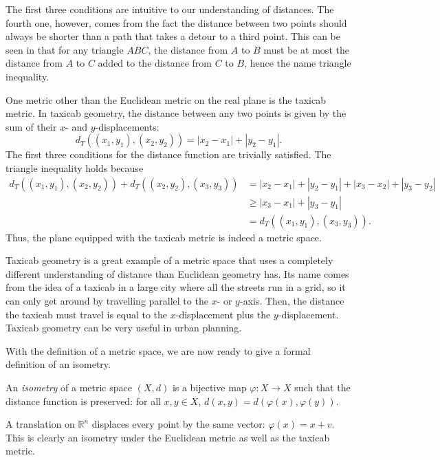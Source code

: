 \documentclass{mystyle}
\begin{document}
The first three conditions are intuitive to our understanding of distances. The fourth one, however, comes from the fact the distance between two points should always be shorter than a path that takes a detour to a third point. This can be seen in that for any triangle $ABC$, the distance from $A$ to $B$ must be at most the distance from $A$ to $C$ added to the distance from $C$ to $B$, hence the name triangle inequality.

\begin{example}
    One metric other than the Euclidean metric on the real plane is the taxicab metric. In taxicab geometry, the distance between any two points is given by the sum of their $x$- and $y$-displacements: 
    \[
    d_T((x_1,y_1), (x_2, y_2)) = |x_2-x_1| + |y_2-y_1|.
    \]
    The first three conditions for the distance function are trivially satisfied. The triangle inequality holds because 
    \begin{align*}
        d_T((x_1, y_1),(x_2, y_2)) + d_T((x_2, y_2),(x_3, y_3)) 
        &= |x_2-x_1| + |y_2-y_1| + |x_3-x_2| + |y_3-y_2| \\
        &\ge |x_3-x_1| + |y_3-y_1| \\
        &= d_T((x_1, y_1),(x_3, y_3)).
    \end{align*}
    Thus, the plane equipped with the taxicab metric is indeed a metric space. 
\end{example}

Taxicab geometry is a great example of a metric space that uses a completely different understanding of distance than Euclidean geometry has. Its name comes from the idea of a taxicab in a large city where all the streets run in a grid, so it can only get around by travelling parallel to the $x$- or $y$-axis. Then, the distance the taxicab must travel is equal to the $x$-displacement plus the $y$-displacement. Taxicab geometry can be very useful in urban planning.

With the definition of a metric space, we are now ready to give a formal definition of an isometry.
\begin{definition}
    An \textit{isometry} of a metric space $(X, d)$ is a bijective map $\varphi: X \to X$ such that the distance function is preserved: for all $x, y \in X$, $d(x, y) = d(\varphi(x), \varphi(y))$.
\end{definition}

\begin{example}\label{ex_taxi_trans}
    A translation on $\mathbb{R}^n$ displaces every point by the same vector: $\varphi(x) = x + v$. This is clearly an isometry under the Euclidean metric as well as the taxicab metric. 
\end{example}
\end{document}
